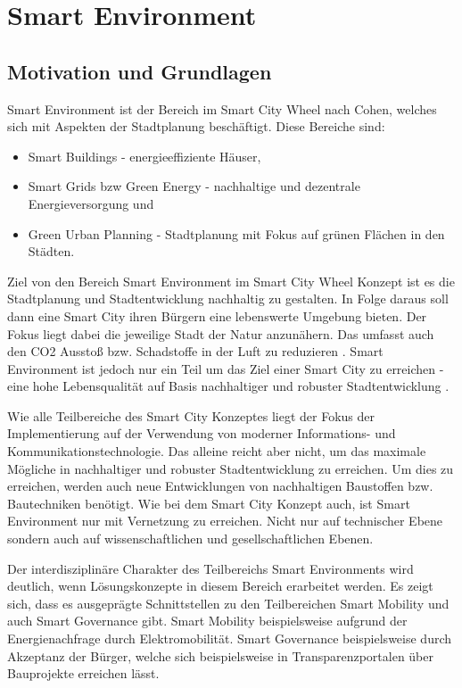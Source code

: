 \section{Smart Environment}
\label{sec:smart_environment}

\subsection{Motivation und Grundlagen}
Smart Environment ist der Bereich im Smart City Wheel nach Cohen, welches sich mit Aspekten der Stadtplanung beschäftigt.
Diese Bereiche sind:
\begin{itemize}
	\item Smart Buildings - energieeffiziente Häuser,
	\item Smart Grids bzw Green Energy - nachhaltige und dezentrale Energieversorgung und
	\item Green Urban Planning - Stadtplanung mit Fokus auf grünen Flächen in den Städten.
\end{itemize}

Ziel von den Bereich Smart Environment im Smart City Wheel Konzept ist es die Stadtplanung und Stadtentwicklung nachhaltig zu gestalten.
In Folge daraus soll dann eine Smart City ihren Bürgern eine lebenswerte Umgebung bieten.
Der Fokus liegt dabei die jeweilige Stadt der Natur anzunähern.
Das umfasst auch den CO2 Ausstoß bzw. Schadstoffe in der Luft zu reduzieren \autocite[vgl.][S. 4]{Monzon.2015}.
Smart Environment ist jedoch nur ein Teil um das Ziel einer Smart City zu erreichen - eine hohe Lebensqualität auf Basis nachhaltiger und robuster Stadtentwicklung \autocite[vgl.][S. 3]{Monzon.2015}.

Wie alle Teilbereiche des Smart City Konzeptes liegt der Fokus der Implementierung auf der Verwendung von moderner Informations- und Kommunikationstechnologie.
Das alleine reicht aber nicht, um das maximale Mögliche in nachhaltiger und robuster Stadtentwicklung zu erreichen.
Um dies zu erreichen, werden auch neue Entwicklungen von nachhaltigen Baustoffen bzw. Bautechniken benötigt.
Wie bei dem Smart City Konzept auch, ist Smart Environment nur mit Vernetzung zu erreichen.
Nicht nur auf technischer Ebene sondern auch auf wissenschaftlichen und gesellschaftlichen Ebenen.

Der interdisziplinäre Charakter des Teilbereichs Smart Environments wird deutlich, wenn Lösungskonzepte in diesem Bereich erarbeitet werden.
Es zeigt sich, dass es ausgeprägte Schnittstellen zu den Teilbereichen Smart Mobility und auch Smart Governance gibt.
Smart Mobility beispielsweise aufgrund der Energienachfrage durch Elektromobilität.
Smart Governance beispielsweise durch Akzeptanz der Bürger, welche sich beispielsweise in Transparenzportalen über Bauprojekte erreichen lässt.

